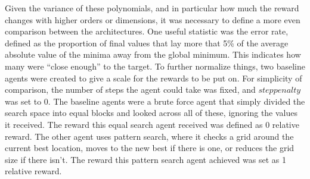%
%        
%    
%

Given the variance of these polynomials, and in particular how much the reward changes with higher orders or dimensions, it was necessary to define a more even comparison between the architectures. One useful statistic was the error rate, defined as the proportion of final values that lay more that 5\% of the average absolute value of the minima away from the global minimum. This indicates how many were ``close enough'' to the target. To further normalize things, two baseline agents were created to give a scale for the rewards to be put on. For simplicity of comparison, the number of steps the agent could take was fixed, and $steppenalty$ was set to 0. The baseline agents were a brute force agent that simply divided the search space into equal blocks and looked across all of these, ignoring the values it received. The reward this equal search agent received was defined as 0 relative reward. The other agent uses pattern search, where it checks a grid around the current best location, moves to the new best if there is one, or reduces the grid size if there isn't. The reward this pattern search agent achieved was set as 1 relative reward.

